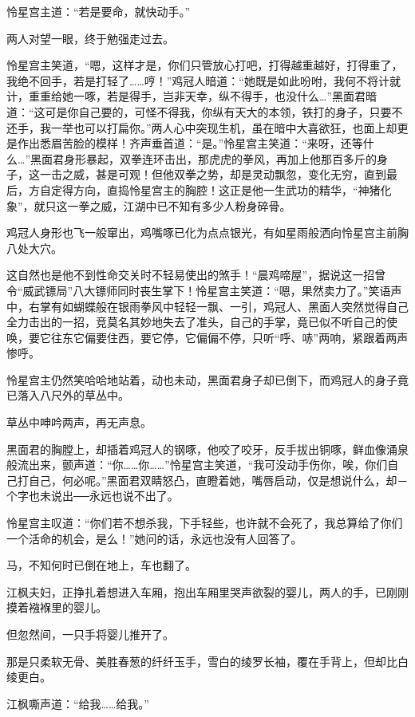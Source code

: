 \documentclass[12pt,oneside]{book}
\begin{document}
怜星宫主道：``若是要命，就快动手。''

两人对望一眼，终于勉强走过去。

怜星宫主笑道，``嗯，这样才是，你们只管放心打吧，打得越重越好，打得重了，我绝不回手，若是打轻了\ldots\ldots 哼！''鸡冠人暗道：``她既是如此吩咐，我何不将计就计，重重给她一啄，若是得手，岂非天幸，纵不得手，也没什么\ldots{}''黑面君暗道：``这可是你自己要的，可怪不得我，你纵有天大的本领，铁打的身子，只要不还手，我一举也可以打扁你。''两人心中突现生机，虽在暗中大喜欲狂，也面上却更是作出悉眉苦脸的模样！齐声垂首道：``是。''怜星宫主笑道：``来呀，还等什么\ldots{}''黑面君身形暴起，双拳连环击出，那虎虎的拳风，再加上他那百多斤的身子，这一击之威，甚是可观！但他双拳之势，却是灵动飘忽，变化无穷，直到最后，方自定得方向，直捣怜星宫主的胸腔！这正是他一生武功的精华，``神猪化象''，就只这一拳之威，江湖中已不知有多少人粉身碎骨。

鸡冠人身形也飞一般窜出，鸡嘴啄已化为点点银光，有如星雨般洒向怜星宫主前胸八处大穴。

这自然也是他不到性命交关时不轻易使出的煞手！``晨鸡啼屋''，据说这一招曾令``威武镖局''八大镖师同时丧生掌下！怜星宫主笑道：``嗯，果然卖力了。''笑语声中，右掌有如蝴蝶般在银雨拳风中轻轻一飘、一引，鸡冠人、黑面人突然觉得自己全力击出的一招，竞莫名其妙地失去了准头，自己的手掌，竟已似不听自己的使唤，要它往东它偏要住西，要它停，它偏偏不停，只听``呼、哧''两响，紧跟着两声惨呼。

怜星宫主仍然笑哈哈地站着，动也未动，黑面君身子却已倒下，而鸡冠人的身子竟已落入八尺外的草丛中。

草丛中呻吟两声，再无声息。

黑面君的胸膛上，却插着鸡冠人的钢啄，他咬了咬牙，反手拔出铜啄，鲜血像涌泉般流出来，颤声道：``你\ldots\ldots 你\ldots\ldots{}''怜星宫主笑道，``我可没动手伤你，唉，你们自己打自己，何必呢。''黑面君双睛怒凸，直瞪着她，嘴唇启动，仅是想说什么，却－个字也未说出──永远也说不出了。

怜星宫主叹道：``你们若不想杀我，下手轻些，也许就不会死了，我总算给了你们一个活命的机会，是么！''她问的话，永远也没有人回答了。

马，不知何时已倒在地上，车也翻了。

江枫夫妇，正挣扎着想进入车厢，抱出车厢里哭声欲裂的婴儿，两人的手，已刚刚摸着襁褓里的婴儿。

但忽然间，一只手将婴儿推开了。

那是只柔软无骨、美胜春葱的纤纤玉手，雪白的绫罗长袖，覆在手背上，但却比白绫更白。

江枫嘶声道：``给我\ldots\ldots 给我。''
\end{document}
